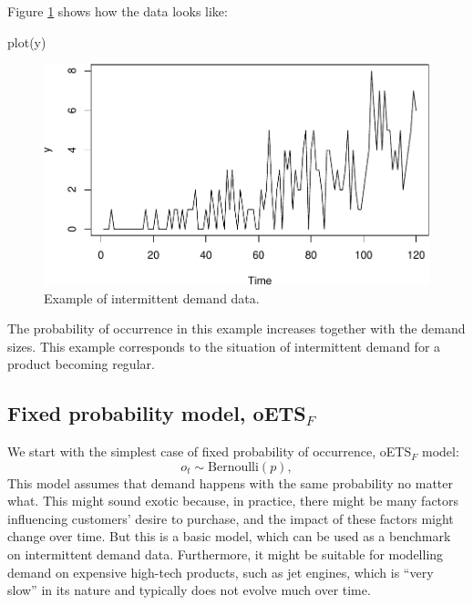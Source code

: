 \documentclass[
]{book}
\newenvironment{Shaded}{\begin{snugshade}}{\end{snugshade}}
\newcommand{\FunctionTok}[1]{\textcolor[rgb]{0.00,0.00,0.00}{#1}}
\newcommand{\NormalTok}[1]{#1}
\theoremstyle{definition}
\theoremstyle{definition}
\theoremstyle{definition}
\theoremstyle{definition}
\theoremstyle{remark}
\begin{document}
Figure \ref{fig:intermittentExamplePlot} shows how the data looks like:

\begin{Shaded}
\begin{Highlighting}[]
\FunctionTok{plot}\NormalTok{(y)}
\end{Highlighting}
\end{Shaded}

\begin{figure}
\centering
\includegraphics{Svetunkov--2022----ADAM_files/figure-latex/intermittentExamplePlot-1.pdf}
\caption{\label{fig:intermittentExamplePlot}Example of intermittent demand data.}
\end{figure}

The probability of occurrence in this example increases together with the demand sizes. This example corresponds to the situation of intermittent demand for a product becoming regular.

\hypertarget{fixed-probability-model-oets_f}{%
\subsection{\texorpdfstring{Fixed probability model, oETS\(_F\)}{Fixed probability model, oETS\_F}}\label{fixed-probability-model-oets_f}}

We start with the simplest case of fixed probability of occurrence, oETS\(_F\) model:
\begin{equation}
    o_t \sim \text{Bernoulli}(p) ,
    \label{eq:oETSFixed}
\end{equation}
This model assumes that demand happens with the same probability no matter what. This might sound exotic because, in practice, there might be many factors influencing customers' desire to purchase, and the impact of these factors might change over time. But this is a basic model, which can be used as a benchmark on intermittent demand data. Furthermore, it might be suitable for modelling demand on expensive high-tech products, such as jet engines, which is ``very slow'' in its nature and typically does not evolve much over time.
\end{document}
